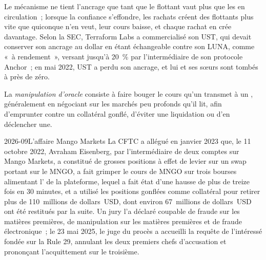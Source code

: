 Le mécanisme ne tient l'ancrage que tant que le  flottant vaut plus que les  en circulation~; lorsque la confiance s'effondre, les rachats créent
des  flottants plus vite que quiconque n'en veut, leur cours baisse, et chaque rachat en crée davantage. Selon la SEC, Terraform Labs
a commercialisé son  UST, qui devait conserver son ancrage au dollar en étant échangeable contre son  LUNA, comme «~à rendement~», versant jusqu'à 20~\%
par l'intermédiaire de son protocole Anchor~; en mai 2022, UST a perdu son ancrage, et lui et ses  sœurs sont tombés à près de zéro.

\begin{definition}\label{def:m3:defi-credit-and-leverage:oracle}
La \emph{manipulation d'oracle} consiste à faire bouger le cours qu'un  transmet à un , généralement en négociant
sur les marchés peu profonds qu'il lit, afin d'emprunter contre un collatéral gonflé, d'éviter une liquidation ou d'en déclencher une.
\end{definition}

\begin{dated}{2026-09}{L'affaire Mango Markets}\label{dat:m3:defi-credit-and-leverage:mango}
La CFTC a allégué en janvier 2023 que, le 11 octobre 2022, Avraham Eisenberg, par l'intermédiaire de deux comptes sur Mango Markets, a constitué de grosses positions à effet de levier
sur un swap portant sur le  MNGO, a fait grimper le cours de MNGO sur trois bourses alimentant l' de la plateforme, lequel a fait état d'une hausse de plus de treize fois en 30 minutes,
et a utilisé les positions gonflées comme collatéral pour retirer plus de 110~millions de dollars~USD, dont environ 67~millions de dollars~USD ont été restitués par la suite. Un jury l'a déclaré coupable de
fraude sur les matières premières, de manipulation sur les matières premières et de fraude électronique~; le 23 mai 2025, le juge du procès a accueilli la requête de l'intéressé fondée sur la Rule 29, annulant les deux premiers
chefs d'accusation et prononçant l'acquittement sur le troisième.
\end{dated}

